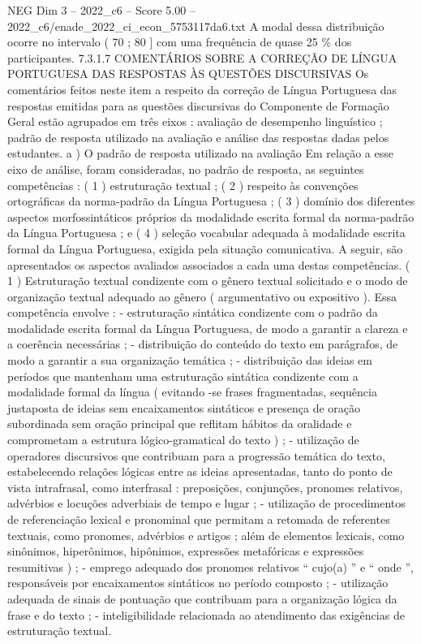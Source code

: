 \begin{textsample}{NEG Dim 3 – 2022\_c6 – Score 5.00 – 2022\_c6/enade\_2022\_ci\_econ\_5753117da6.txt}
A modal dessa distribuição ocorre no intervalo ( 70 ; 80 ] com uma frequência de quase 25 \% dos participantes. 7.3.1.7 COMENTÁRIOS SOBRE A CORREÇÃO DE LÍNGUA PORTUGUESA DAS RESPOSTAS ÀS QUESTÕES DISCURSIVAS Os comentários feitos neste item a respeito da correção de Língua Portuguesa das respostas emitidas para as questões discursivas do Componente de Formação Geral estão agrupados em três eixos : avaliação de desempenho linguístico ; padrão de resposta utilizado na avaliação e análise das respostas dadas pelos estudantes. a ) O padrão de resposta utilizado na avaliação Em relação a esse eixo de análise, foram consideradas, no padrão de resposta, as seguintes competências : ( 1 ) estruturação textual ; ( 2 ) respeito às convenções ortográficas da norma-padrão da Língua Portuguesa ; ( 3 ) domínio dos diferentes aspectos morfossintáticos próprios da modalidade escrita formal da norma-padrão da Língua Portuguesa ; e ( 4 ) seleção vocabular adequada à modalidade escrita formal da Língua Portuguesa, exigida pela situação comunicativa.
A seguir, são apresentados os aspectos avaliados associados a cada uma destas competências. ( 1 ) Estruturação textual condizente com o gênero textual solicitado e o modo de organização textual adequado ao gênero ( argumentativo ou expositivo ).
Essa competência envolve : - estruturação sintática condizente com o padrão da modalidade escrita formal da Língua Portuguesa, de modo a garantir a clareza e a coerência necessárias ; - distribuição do conteúdo do texto em parágrafos, de modo a garantir a sua organização temática ; - distribuição das ideias em períodos que mantenham uma estruturação sintática condizente com a modalidade formal da língua ( evitando -se frases fragmentadas, sequência justaposta de ideias sem encaixamentos sintáticos e presença de oração subordinada sem oração principal que reflitam hábitos da oralidade e comprometam a estrutura lógico-gramatical do texto ) ; - utilização de operadores discursivos que contribuam para a progressão temática do texto, estabelecendo relações lógicas entre as ideias apresentadas, tanto do ponto de vista intrafrasal, como interfrasal : preposições, conjunções, pronomes relativos, advérbios e locuções adverbiais de tempo e lugar ; - utilização de procedimentos de referenciação lexical e pronominal que permitam a retomada de referentes textuais, como pronomes, advérbios e artigos ; além de elementos lexicais, como sinônimos, hiperônimos, hipônimos, expressões metafóricas e expressões resumitivas ) ; - emprego adequado dos pronomes relativos “ cujo(a) ” e “ onde ”, responsáveis por encaixamentos sintáticos no período composto ; - utilização adequada de sinais de pontuação que contribuam para a organização lógica da frase e do texto ; - inteligibilidade relacionada ao atendimento das exigências de estruturação textual.

\end{textsample}
